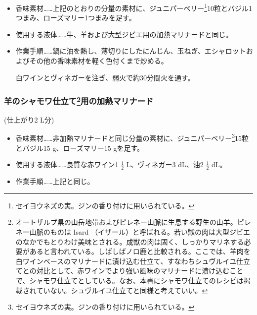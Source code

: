 \begin{recette}
\begin{itemize}
\item
  香味素材\ldots{}\ldots{}上記のとおりの分量の素材に、ジュニパーベリー\footnote{セイヨウネズの実。ジンの香り付けに用いられている。}10粒とバジル1つまみ、ローズマリー1つまみを足す。
\item
  使用する液体\ldots{}\ldots{}牛、羊および大型ジビエ用の加熱マリナードと同じ。
\item
  作業手順\ldots{}\ldots{}鍋に油を熱し、薄切りにしたにんじん、玉ねぎ、エシャロットおよびその他の香味素材を軽く色付くまで炒める。

  白ワインとヴィネガーを注ぎ、弱火で約30分間火を通す。
\end{itemize}

\atoaki{}

\hypertarget{marinade-cuite-pour-le-mouton-en-chamois}{%
\subsubsection[羊のシャモワ仕立て用の加熱マリナード]{\texorpdfstring{羊のシャモワ仕立て\footnote{オートザルプ県の山岳地帯およびピレネー山脈に生息する野生の山羊。ピレネー山脈のものは
  Isard
  （イザール）と呼ばれる。若い獣の肉は大型ジビエのなかでもとりわけ美味とされる。成獣の肉は固く、しっかりマリネする必要があると言われている。しばしばノロ鹿と比較される。ここでは、羊肉を白ワインベースのマリナードに漬け込む仕立て、すなわちシュヴルイユ仕立てとの対比として、赤ワインでより強い風味のマリナードに漬け込むことで、シャモワ仕立てとしている。なお、本書にシャモワ仕立てのレシピは掲載されていない。シュヴルイユ仕立てと同様と考えていい。}用の加熱マリナード}{羊のシャモワ仕立て用の加熱マリナード}}\label{marinade-cuite-pour-le-mouton-en-chamois}}



(仕上がり2 L分)

\begin{itemize}
\item
  香味素材\ldots{}\ldots{}非加熱マリナードと同じ分量の素材に、ジュニパーベリー\footnote{セイヨウネズの実。ジンの香り付けに用いられている。}15粒とバジル15
  g、ローズマリー15 gを足す。
\item
  使用する液体\ldots{}\ldots{}良質な赤ワイン1 \(\frac{1}{2}\)
  L、ヴィネガー3 dL、油2 \(\frac{1}{2}\) dL。
\item
  作業手順\ldots{}\ldots{}上記と同じ。


\end{itemize}
\end{recette}
